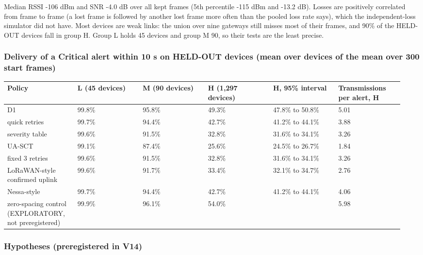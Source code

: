 Median RSSI -106 dBm and SNR -4.0 dB over all kept frames (5th percentile -115 dBm and -13.2 dB). Losses are positively correlated from frame to frame (a lost frame is followed by another lost frame more often than the pooled loss rate says), which the independent-loss simulator did not have. Most devices are weak links: the union over nine gateways still misses most of their frames, and 90\% of the HELD-OUT devices fall in group H. Group L holds 45 devices and group M 90, so their tests are the least precise.

\subsubsection*{Delivery of a Critical alert within 10 s on HELD-OUT devices (mean over devices of the mean over 300 start frames)}

{\scriptsize\raggedright
\begin{longtable}{p{0.158\linewidth}p{0.158\linewidth}p{0.158\linewidth}p{0.158\linewidth}p{0.158\linewidth}p{0.158\linewidth}}
\toprule
Policy & L (45 devices) & M (90 devices) & H (1,297 devices) & H, 95\% interval & Transmissions per alert, H \\
\midrule
\endhead
D1 & 99.8\% & 95.8\% & 49.3\% & 47.8\% to 50.8\% & 5.01 \\
quick retries & 99.7\% & 94.4\% & 42.7\% & 41.2\% to 44.1\% & 3.88 \\
severity table & 99.6\% & 91.5\% & 32.8\% & 31.6\% to 34.1\% & 3.26 \\
UA-SCT & 99.1\% & 87.4\% & 25.6\% & 24.5\% to 26.7\% & 1.84 \\
fixed 3 retries & 99.6\% & 91.5\% & 32.8\% & 31.6\% to 34.1\% & 3.26 \\
LoRaWAN-style confirmed uplink & 99.6\% & 91.7\% & 33.4\% & 32.1\% to 34.7\% & 2.76 \\
Nessa-style & 99.7\% & 94.4\% & 42.7\% & 41.2\% to 44.1\% & 4.06 \\
zero-spacing control (EXPLORATORY, not preregistered) & 99.9\% & 96.1\% & 54.0\% &  & 5.98 \\
\bottomrule
\end{longtable}}

\subsubsection*{Hypotheses (preregistered in V14)}

